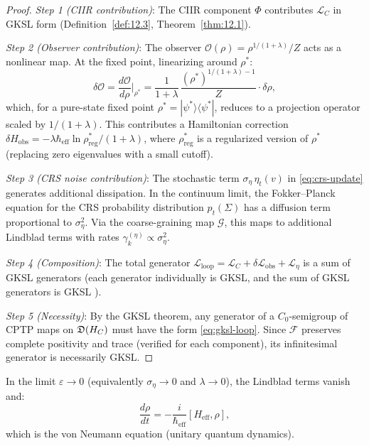 \begin{proof}
\emph{Step 1 (CIIR contribution)}: The CIIR component $\Phi$
contributes $\mathcal{L}_C$ in GKSL form (Definition~\ref{def:12.3},
Theorem~\ref{thm:12.1}).

\emph{Step 2 (Observer contribution)}: The observer
$\mathcal{O}(\rho) = \rho^{1/(1+\lambda)}/Z$ acts as a nonlinear map.
At the fixed point, linearizing around $\rho^*$:
\[
  \delta\mathcal{O} = \frac{d\mathcal{O}}{d\rho}\bigg|_{\rho^*}
  = \frac{1}{1+\lambda}\,\frac{(\rho^*)^{1/(1+\lambda)-1}}{Z}
  \cdot \delta\rho,
\]
which, for a pure-state fixed point $\rho^* = |\psi^*\rangle\langle\psi^*|$,
reduces to a projection operator scaled by $1/(1+\lambda)$.
This contributes a Hamiltonian correction
$\delta H_{\mathrm{obs}} = -\lambda \hbar_{\mathrm{eff}}
\ln \rho^*_{\mathrm{reg}} / (1+\lambda)$, where $\rho^*_{\mathrm{reg}}$
is a regularized version of $\rho^*$ (replacing zero eigenvalues
with a small cutoff).

\emph{Step 3 (CRS noise contribution)}: The stochastic term
$\sigma_\eta\,\eta_t(v)$ in \eqref{eq:crs-update} generates
additional dissipation.  In the continuum limit, the Fokker--Planck
equation for the CRS probability distribution
$p_t(\Sigma)$ has a diffusion term proportional to $\sigma_\eta^2$.
Via the coarse-graining map $\mathcal{G}$, this maps to additional
Lindblad terms with rates $\gamma_k^{(\eta)} \propto \sigma_\eta^2$.

\emph{Step 4 (Composition)}: The total generator
$\mathcal{L}_{\mathrm{loop}} = \mathcal{L}_C + \delta\mathcal{L}_{\mathrm{obs}}
+ \mathcal{L}_\eta$ is a sum of GKSL generators
(each generator individually is GKSL, and the sum of GKSL generators is
GKSL \cite{Lindblad1976}).

\emph{Step 5 (Necessity)}: By the GKSL theorem, any generator of a
$C_0$-semigroup of CPTP maps on $\mathfrak{D}(H_C)$ must have the
form \eqref{eq:gksl-loop}.  Since $\mathcal{F}$ preserves complete
positivity and trace (verified for each component), its infinitesimal
generator is necessarily GKSL.
\end{proof}

\begin{corollary}\label{cor:13.2}
In the limit $\varepsilon \to 0$ (equivalently $\sigma_\eta \to 0$
and $\lambda \to 0$), the Lindblad terms vanish and:
\[
  \frac{d\rho}{dt} = -\frac{i}{\hbar_{\mathrm{eff}}}[H_{\mathrm{eff}}, \rho],
\]
which is the von Neumann equation (unitary quantum dynamics).
\end{corollary}


